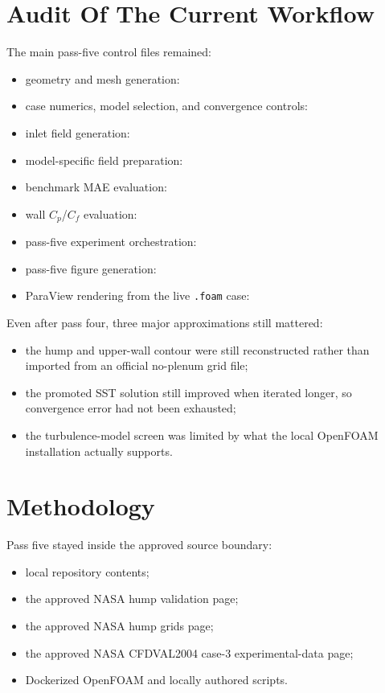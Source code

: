 \documentclass[11pt]{article}
\begin{document}
\section{Audit Of The Current Workflow}
The main pass-five control files remained:
\begin{itemize}
\item geometry and mesh generation:
\item case numerics, model selection, and convergence controls:
\item inlet field generation:
\item model-specific field preparation:
\item benchmark MAE evaluation:
\item wall \(C_p\)/\(C_f\) evaluation:
\item pass-five experiment orchestration:
\item pass-five figure generation:
\item ParaView rendering from the live \texttt{.foam} case:
\end{itemize}

Even after pass four, three major approximations still mattered:
\begin{itemize}
\item the hump and upper-wall contour were still reconstructed rather than imported from an official no-plenum grid file;
\item the promoted SST solution still improved when iterated longer, so convergence error had not been exhausted;
\item the turbulence-model screen was limited by what the local OpenFOAM installation actually supports.
\end{itemize}

\section{Methodology}
Pass five stayed inside the approved source boundary:
\begin{itemize}
\item local repository contents;
\item the approved NASA hump validation page;
\item the approved NASA hump grids page;
\item the approved NASA CFDVAL2004 case-3 experimental-data page;
\item Dockerized OpenFOAM and locally authored scripts.
\end{itemize}
\end{document}
